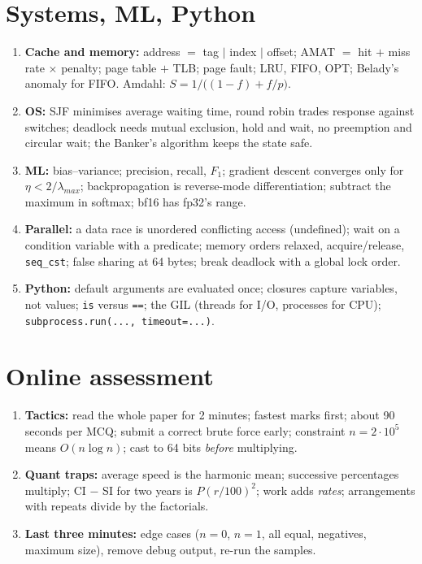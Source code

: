 \documentclass[10pt,a4paper,openany,oneside]{report}
\begin{document}
\section*{Systems, ML, Python}
\begin{enumerate}[nosep,leftmargin=2.2em,start=33,label=\textbf{\arabic*.}]
\item \textbf{Cache and memory:} address $=$ tag $|$ index $|$ offset; AMAT $=$ hit $+$ miss rate $\times$ penalty; page table $+$ TLB; page fault; LRU, FIFO, OPT; Belady's anomaly for FIFO. Amdahl: $S=1/\big((1-f)+f/p\big)$.
\item \textbf{OS:} SJF minimises average waiting time, round robin trades response against switches; deadlock needs mutual exclusion, hold and wait, no preemption and circular wait; the Banker's algorithm keeps the state safe.
\item \textbf{ML:} bias--variance; precision, recall, $F_1$; gradient descent converges only for $\eta<2/\lambda_{max}$; backpropagation is reverse-mode differentiation; subtract the maximum in softmax; bf16 has fp32's range.
\item \textbf{Parallel:} a data race is unordered conflicting access (undefined); wait on a condition variable with a predicate; memory orders relaxed, acquire/release, \texttt{seq\_cst}; false sharing at 64 bytes; break deadlock with a global lock order.
\item \textbf{Python:} default arguments are evaluated once; closures capture variables, not values; \texttt{is} versus \texttt{==}; the GIL (threads for I/O, processes for CPU); \texttt{subprocess.run(..., timeout=...)}.
\end{enumerate}
\section*{Online assessment}
\begin{enumerate}[nosep,leftmargin=2.2em,start=38,label=\textbf{\arabic*.}]
\item \textbf{Tactics:} read the whole paper for 2 minutes; fastest marks first; about 90 seconds per MCQ; submit a correct brute force early; constraint $n=2\cdot10^5$ means $O(n\log n)$; cast to 64 bits \emph{before} multiplying.
\item \textbf{Quant traps:} average speed is the harmonic mean; successive percentages multiply; CI $-$ SI for two years is $P(r/100)^2$; work adds \emph{rates}; arrangements with repeats divide by the factorials.
\item \textbf{Last three minutes:} edge cases ($n=0$, $n=1$, all equal, negatives, maximum size), remove debug output, re-run the samples.
\end{enumerate}
\end{document}
